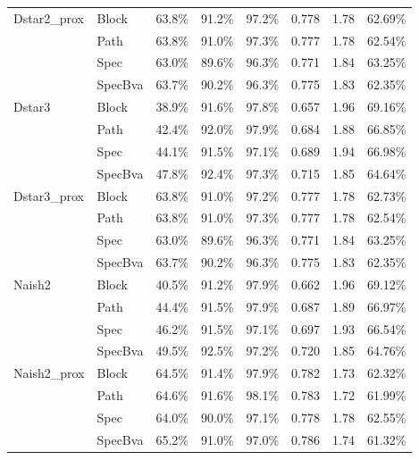 \begin{table}[htbp]
\begin{tabular}{l l c c c c c c}
\hline
Dstar2\_prox & Block & 63.8\% & 91.2\% & 97.2\% & 0.778 & 1.78 & 62.69\% \\
 & Path & 63.8\% & 91.0\% & 97.3\% & 0.777 & 1.78 & 62.54\% \\
 & Spec & 63.0\% & 89.6\% & 96.3\% & 0.771 & 1.84 & 63.25\% \\
 & SpecBva & 63.7\% & 90.2\% & 96.3\% & 0.775 & 1.83 & 62.35\% \\
\hline
Dstar3 & Block & 38.9\% & 91.6\% & 97.8\% & 0.657 & 1.96 & 69.16\% \\
 & Path & 42.4\% & 92.0\% & 97.9\% & 0.684 & 1.88 & 66.85\% \\
 & Spec & 44.1\% & 91.5\% & 97.1\% & 0.689 & 1.94 & 66.98\% \\
 & SpecBva & 47.8\% & 92.4\% & 97.3\% & 0.715 & 1.85 & 64.64\% \\
\hline
Dstar3\_prox & Block & 63.8\% & 91.0\% & 97.2\% & 0.777 & 1.78 & 62.73\% \\
 & Path & 63.8\% & 91.0\% & 97.3\% & 0.777 & 1.78 & 62.54\% \\
 & Spec & 63.0\% & 89.6\% & 96.3\% & 0.771 & 1.84 & 63.25\% \\
 & SpecBva & 63.7\% & 90.2\% & 96.3\% & 0.775 & 1.83 & 62.35\% \\
\hline
Naish2 & Block & 40.5\% & 91.2\% & 97.9\% & 0.662 & 1.96 & 69.12\% \\
 & Path & 44.4\% & 91.5\% & 97.9\% & 0.687 & 1.89 & 66.97\% \\
 & Spec & 46.2\% & 91.5\% & 97.1\% & 0.697 & 1.93 & 66.54\% \\
 & SpecBva & 49.5\% & 92.5\% & 97.2\% & 0.720 & 1.85 & 64.76\% \\
\hline
Naish2\_prox & Block & 64.5\% & 91.4\% & 97.9\% & 0.782 & 1.73 & 62.32\% \\
 & Path & 64.6\% & 91.6\% & 98.1\% & 0.783 & 1.72 & 61.99\% \\
 & Spec & 64.0\% & 90.0\% & 97.1\% & 0.778 & 1.78 & 62.55\% \\
 & SpecBva & 65.2\% & 91.0\% & 97.0\% & 0.786 & 1.74 & 61.32\% \\
\hline
\end{tabular}
\end{table}
